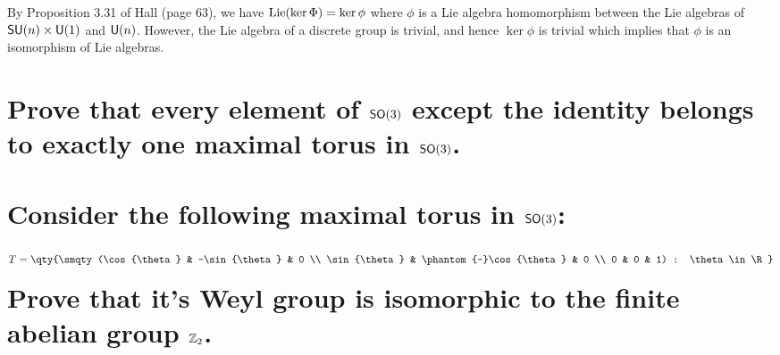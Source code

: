 \documentclass[
	pages,
	boxes,
	color=WildStrawberry
]{homework}
\theoremstyle{plain}
\begin{document}
\begin{solution}
	By Proposition 3.31 of Hall (page 63), we have $\operatorname{Lie}(\ker\Phi) = \ker\phi$ where $\phi$ is a Lie algebra homomorphism between the Lie algebras of $\mathsf{SU}(n)\times\mathsf{U}(1)$ and $\mathsf{U}(n)$. However, the Lie algebra of a discrete group is trivial, and hence $\ker\phi$ is trivial which implies that $\phi$ is an isomorphism of Lie algebras.
\end{solution}

\begin{problem}
\begin{parts}
	\part{Prove that every element of $\mathsf{SO}(3)$ except the identity belongs to exactly one maximal torus in $\mathsf{SO}(3)$.}\label{part:2a}
	\part{Consider the following maximal torus in $\mathsf{SO}(3)$:
		\begin{equation*}
			T = \qty{\smqty(\cos{\theta} & -\sin{\theta} & 0 \\ \sin{\theta} & \phantom{-}\cos{\theta} & 0 \\ 0 & 0 & 1) : \theta\in\R}
		\end{equation*}
		Prove that it's Weyl group is isomorphic to the finite abelian group $\mathbb{Z}_2$.}\label{part:2b}
\end{parts}
\end{problem}
\end{document}
